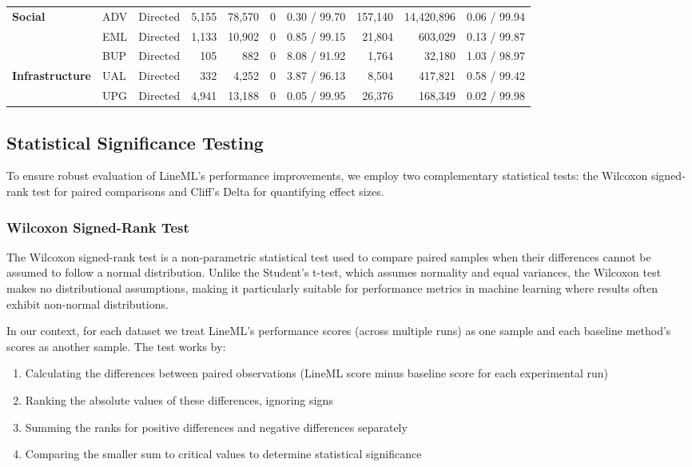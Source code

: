 \documentclass[pdflatex,sn-mathphys-num]{sn-jnl}%
\theoremstyle{thmstyleone}%
\theoremstyle{thmstyletwo}%
\theoremstyle{thmstylethree}%
\theoremstyle{plain} %
\theoremstyle{definition} %
\theoremstyle{remark} %
\theoremstyle{plain} %
\begin{document}
\begin{table}[!ht]
{\begin{tabular}{lllrrrrrrr}
\multirow{3}{*}{\textbf{Social}} 
 & ADV & Directed & 5,155 & 78,570 & 0 & 0.30 / 99.70 & 157,140 & 14,420,896 & 0.06 / 99.94 \\
 & EML & Directed & 1,133 & 10,902 & 0 & 0.85 / 99.15 & 21,804 & 603,029 & 0.13 / 99.87 \\
 & BUP & Directed & 105 & 882 & 0 & 8.08 / 91.92 & 1,764 & 32,180 & 1.03 / 98.97 \\
\midrule

\multirow{2}{*}{\textbf{Infrastructure}} 
 & UAL & Directed & 332 & 4,252 & 0 & 3.87 / 96.13 & 8,504 & 417,821 & 0.58 / 99.42 \\
 & UPG & Directed & 4,941 & 13,188 & 0 & 0.05 / 99.95 & 26,376 & 168,349 & 0.02 / 99.98 \\

\bottomrule
\end{tabular}%
}
\end{table}


\subsection{Statistical Significance Testing}
\label{subsec:statistical_tests}

To ensure robust evaluation of LineML's performance improvements, we employ two complementary statistical tests: the Wilcoxon signed-rank test for paired comparisons and Cliff's Delta for quantifying effect sizes. 

\subsubsection{Wilcoxon Signed-Rank Test}
The Wilcoxon signed-rank test \cite{wilcoxon1945individual} is a non-parametric statistical test used to compare paired samples when their differences cannot be assumed to follow a normal distribution. 
Unlike the Student's t-test, which assumes normality and equal variances, the Wilcoxon test makes no distributional assumptions, making it particularly suitable for performance metrics in machine learning where results often exhibit non-normal distributions.

In our context, for each dataset we treat LineML's performance scores (across multiple runs) as one sample and each baseline method's scores as another sample. 
The test works by:
\begin{enumerate}
    \item Calculating the differences between paired observations (LineML score minus baseline score for each experimental run)
    \item Ranking the absolute values of these differences, ignoring signs
    \item Summing the ranks for positive differences and negative differences separately
    \item Comparing the smaller sum to critical values to determine statistical significance
\end{enumerate}
\end{document}
